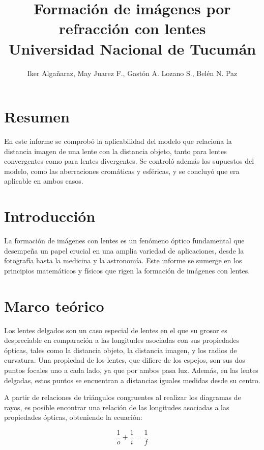 \documentclass[a4paper,12pt]{article}
\title{Formación de imágenes por refracción con lentes \\ 
\medskip \large Universidad Nacional de Tucumán}
\author{Iker Algañaraz, May Juarez F., Gastón A. Lozano S., Belén N. Paz}
\date{}
\begin{document}
\maketitle

\section*{Resumen}

    En este informe se comprobó la aplicabilidad del modelo que relaciona la distancia imagen de una lente con la distancia objeto, tanto para lentes convergentes como para lentes divergentes. Se controló además los supuestos del modelo, como las aberraciones cromáticas y esféricas, y se concluyó que era aplicable en ambos casos.

\medskip

\begin{multicols*}{2}

\section*{Introducción}

    La formación de imágenes con lentes es un fenómeno óptico fundamental que desempeña un papel crucial en una amplia variedad de aplicaciones, desde la fotografía hasta la medicina y la astronomía. Este informe se sumerge en los principios matemáticos y físicos que rigen la formación de imágenes con lentes.

\section*{Marco teórico}

    Los lentes delgados son un caso especial de lentes en el que su grosor es despreciable en comparación a las longitudes asociadas con sus propiedades ópticas, tales como la distancia objeto, la distancia imagen, y los radios de curvatura. Una propiedad de los lentes, que difiere de los espejos, son sus dos puntos focales uno a cada lado, ya que por ambos pasa luz. Además, en las lentes delgadas, estos puntos se encuentran a distancias iguales medidas desde su centro.

    A partir de relaciones de triángulos congruentes al realizar los diagramas de rayos, es posible encontrar una relación de las longitudes asociadas a las propiedades ópticas, obteniendo la ecuación:
    
    \begin{equation} 
        \label{eq:1/i+1/o}
        \frac{1}{o}+\frac{1}{i}=\frac{1}{f}
    \end{equation}


\end{multicols*}
\end{document}
